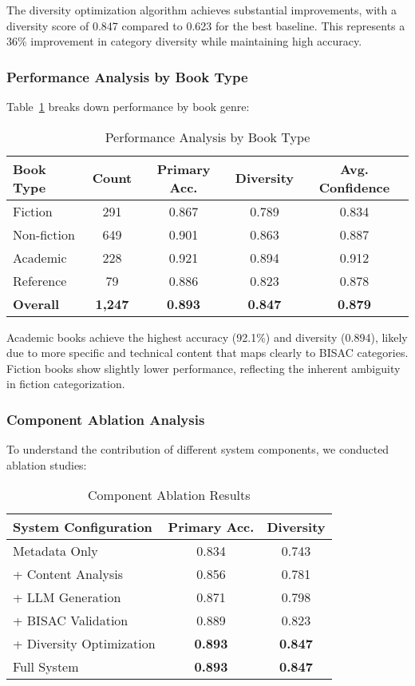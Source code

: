 \documentclass{article}
\begin{document}
The diversity optimization algorithm achieves substantial improvements, with a diversity score of 0.847 compared to 0.623 for the best baseline. This represents a 36\% improvement in category diversity while maintaining high accuracy.

\subsubsection{Performance Analysis by Book Type}

Table~\ref{tab:performance_by_type} breaks down performance by book genre:

\begin{table}[ht]
\centering
\caption{Performance Analysis by Book Type}
\label{tab:performance_by_type}
\begin{tabular}{@{}lcccc@{}}
\toprule
Book Type & Count & Primary Acc. & Diversity & Avg. Confidence \\
\midrule
Fiction & 291 & 0.867 & 0.789 & 0.834 \\
Non-fiction & 649 & 0.901 & 0.863 & 0.887 \\
Academic & 228 & 0.921 & 0.894 & 0.912 \\
Reference & 79 & 0.886 & 0.823 & 0.878 \\
\midrule
\textbf{Overall} & \textbf{1,247} & \textbf{0.893} & \textbf{0.847} & \textbf{0.879} \\
\bottomrule
\end{tabular}
\end{table}

Academic books achieve the highest accuracy (92.1\%) and diversity (0.894), likely due to more specific and technical content that maps clearly to BISAC categories. Fiction books show slightly lower performance, reflecting the inherent ambiguity in fiction categorization.

\subsubsection{Component Ablation Analysis}

To understand the contribution of different system components, we conducted ablation studies:

\begin{table}[ht]
\centering
\caption{Component Ablation Results}
\label{tab:ablation_results}
\begin{tabular}{@{}lcc@{}}
\toprule
System Configuration & Primary Acc. & Diversity \\
\midrule
Metadata Only & 0.834 & 0.743 \\
+ Content Analysis & 0.856 & 0.781 \\
+ LLM Generation & 0.871 & 0.798 \\
+ BISAC Validation & 0.889 & 0.823 \\
+ Diversity Optimization & \textbf{0.893} & \textbf{0.847} \\
\midrule
Full System & \textbf{0.893} & \textbf{0.847} \\
\bottomrule
\end{tabular}
\end{table}
\end{document}
